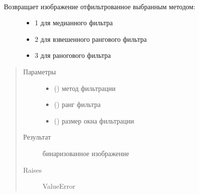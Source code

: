 \documentclass[letterpaper,10pt,russian]{sphinxmanual}
\begin{document}
\begin{fulllineitems}
\begin{fulllineitems}
\label{\detokenize{OCRImage:image.OCRImage.get_filtered_image}}~\begin{description}
\item[{Возвращает изображение отфильтрованное выбранным методом:}] \leavevmode\begin{itemize}
\item {} 
1 \sphinxhyphen{} для медианного фильтра

\item {} 
2 \sphinxhyphen{} для взвешенного рангового фильтра

\item {} 
3 \sphinxhyphen{} для раногового фильтра

\end{itemize}

\end{description}
\begin{quote}\begin{description}
\item[{Параметры}] \leavevmode\begin{itemize}
\item {} 
 () \textendash{} метод фильтрации

\item {} 
 () \textendash{} ранг фильтра

\item {} 
 () \textendash{} размер окна фильтрации

\end{itemize}

\item[{Результат}] \leavevmode
{} \textendash{} бинаризованное изображение

\item[{Raises}] \leavevmode
ValueError

\end{description}\end{quote}


\end{fulllineitems}
\end{fulllineitems}
\end{document}

